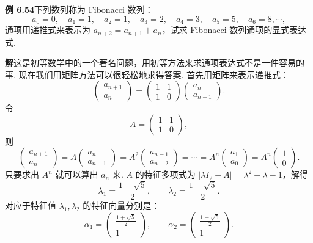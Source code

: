 \documentclass[UTF8, 12pt, fontset=fandol, oneside]{ctexart}
\begin{document}
\noindent\textbf{例 6.54}\quad 下列数列称为 Fibonacci 数列：
\[
a_0=0,\quad a_1=1,\quad a_2=1,\quad a_3=2,\quad a_4=3,\quad a_5=5,\quad a_6=8,\cdots,
\]
通项用递推式来表示为 $a_{n+2}=a_{n+1}+a_n$，试求 Fibonacci 数列通项的显式表达式.

\noindent\textbf{解}\quad 这是初等数学中的一个著名问题，用初等方法来求通项表达式不是一件容易的事. 现在我们用矩阵方法可以很轻松地求得答案. 首先用矩阵来表示递推式：
\[
\left(\begin{array}{c}
a_{n+1}\\
a_n
\end{array}\right)
=\left(\begin{array}{cc}
1 & 1\\
1 & 0
\end{array}\right)
\left(\begin{array}{c}
a_n\\
a_{n-1}
\end{array}\right).
\]
令
\[
A=\left(\begin{array}{cc}
1 & 1\\
1 & 0
\end{array}\right),
\]
则
\[
\left(\begin{array}{c}
a_{n+1}\\
a_n
\end{array}\right)
=A\left(\begin{array}{c}
a_n\\
a_{n-1}
\end{array}\right)
=A^2\left(\begin{array}{c}
a_{n-1}\\
a_{n-2}
\end{array}\right)
=\cdots
=A^n\left(\begin{array}{c}
a_1\\
a_0
\end{array}\right)
=A^n\left(\begin{array}{c}
1\\
0
\end{array}\right).
\]
只要求出 $A^n$ 就可以算出 $a_n$ 来. $A$ 的特征多项式为 $|\lambda I_2-A|=\lambda^2-\lambda-1$，解得
\[
\lambda_1=\frac{1+\sqrt{5}}{2},\qquad
\lambda_2=\frac{1-\sqrt{5}}{2}.
\]
对应于特征值 $\lambda_1,\lambda_2$ 的特征向量分别是：
\[
\alpha_1=\left(\begin{array}{c}
\frac{1+\sqrt{5}}{2}\\
1
\end{array}\right),\qquad
\alpha_2=\left(\begin{array}{c}
\frac{1-\sqrt{5}}{2}\\
1
\end{array}\right).
\]
\end{document}
